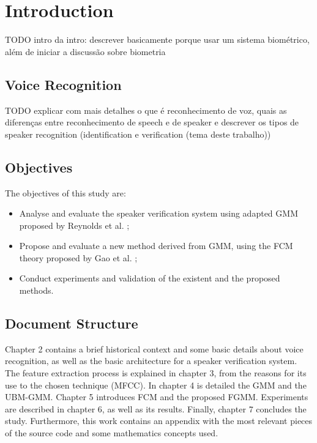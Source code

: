 \chapter{Introduction}

TODO intro da intro: descrever basicamente porque usar um sistema biométrico, além de iniciar a discussão sobre biometria

\section{Voice Recognition}

TODO explicar com mais detalhes o que é reconhecimento de voz, quais as diferenças entre reconhecimento de speech e de speaker e descrever os tipos de speaker recognition (identification e verification (tema deste trabalho))

\section{Objectives}

The objectives of this study are:

\begin{itemize}\itemsep0pt
    \item Analyse and evaluate the speaker verification system using adapted GMM proposed by Reynolds et al. \autocite{reynolds.quatieri.dunn.2000};
    \item Propose and evaluate a new method derived from GMM, using the FCM theory proposed by Gao et al. \autocite{gao.zhou.pu.2013};
    \item Conduct experiments and validation of the existent and the proposed methods.
\end{itemize}

\section{Document Structure}

Chapter 2 contains a brief historical context and some basic details about voice recognition, as well as the basic architecture for a speaker verification system. The feature extraction process is explained in chapter 3, from the reasons for its use to the chosen technique (MFCC). In chapter 4 is detailed the GMM and the UBM-GMM. Chapter 5 introduces FCM and the proposed FGMM. Experiments are described in chapter 6, as well as its results. Finally, chapter 7 concludes the study. Furthermore, this work contains an appendix with the most relevant pieces of the source code and some mathematics concepts used.